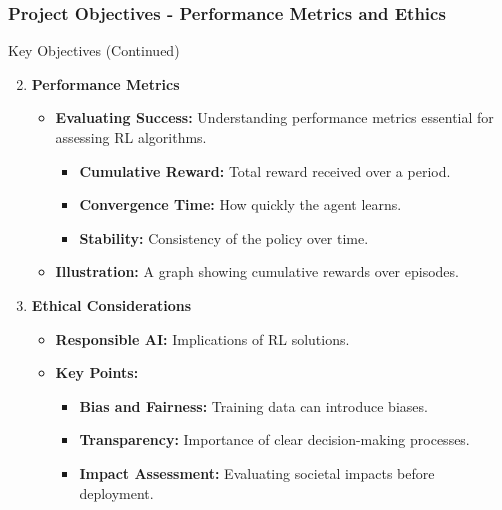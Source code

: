 \documentclass[aspectratio=169]{beamer}
\begin{document}
\begin{frame}[fragile]
    \frametitle{Project Objectives - Performance Metrics and Ethics}
    \begin{block}{Key Objectives (Continued)}
        \begin{enumerate}
            \setcounter{enumi}{1}
            \item \textbf{Performance Metrics}
            \begin{itemize}
                \item \textbf{Evaluating Success:} Understanding performance metrics essential for assessing RL algorithms.
                \begin{itemize}
                    \item \textbf{Cumulative Reward:} Total reward received over a period.
                    \item \textbf{Convergence Time:} How quickly the agent learns.
                    \item \textbf{Stability:} Consistency of the policy over time.
                \end{itemize}
                \item \textbf{Illustration:} A graph showing cumulative rewards over episodes.
            \end{itemize}
            
            \item \textbf{Ethical Considerations}
            \begin{itemize}
                \item \textbf{Responsible AI:} Implications of RL solutions.
                \item \textbf{Key Points:}
                \begin{itemize}
                    \item \textbf{Bias and Fairness:} Training data can introduce biases.
                    \item \textbf{Transparency:} Importance of clear decision-making processes.
                    \item \textbf{Impact Assessment:} Evaluating societal impacts before deployment.
                \end{itemize}
            \end{itemize}
        \end{enumerate}
    \end{block}
\end{frame}
\end{document}
